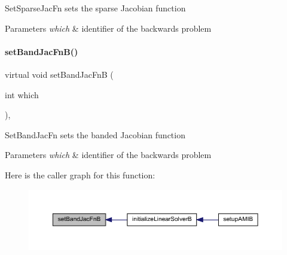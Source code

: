 Set\+Sparse\+Jac\+Fn sets the sparse Jacobian function


\begin{DoxyParams}{Parameters}
{\em which} & identifier of the backwards problem \\
\hline
\end{DoxyParams}
\mbox{\label{classamici_1_1_solver_a1040308561e87b1e2d24c3ab9581e14d}} 
\paragraph{\texorpdfstring{set\+Band\+Jac\+Fn\+B()}{setBandJacFnB()}}
{\footnotesize\ttfamily virtual void set\+Band\+Jac\+FnB (\begin{DoxyParamCaption}\item[{int}]{which }\end{DoxyParamCaption})\hspace{0.3cm}{\ttfamily [protected]}, {}}

Set\+Band\+Jac\+Fn sets the banded Jacobian function


\begin{DoxyParams}{Parameters}
{\em which} & identifier of the backwards problem \\
\hline
\end{DoxyParams}
Here is the caller graph for this function\+:
\nopagebreak
\begin{figure}[H]
\begin{center}
\leavevmode
\includegraphics[width=350pt]{classamici_1_1_solver_a1040308561e87b1e2d24c3ab9581e14d_icgraph}
\end{center}
\end{figure}
\mbox{\label{classamici_1_1_solver_a2c30d06de7f3f5f452dc80d5f03db9d7}} 
